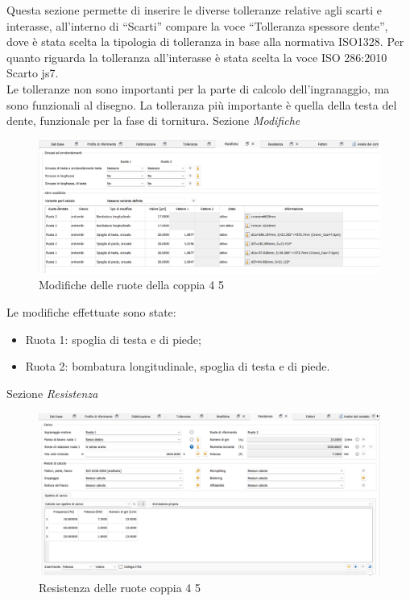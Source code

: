 Questa sezione permette di inserire le diverse tolleranze relative agli scarti e interasse, all’interno di “Scarti” compare la voce “Tolleranza spessore dente”, dove è stata scelta la tipologia di tolleranza in base alla normativa ISO1328. Per quanto riguarda la tolleranza all’interasse è stata scelta la voce ISO 286:2010 Scarto js7.\\
Le tolleranze non sono importanti per la parte di calcolo dell’ingranaggio, ma sono funzionali al disegno. La tolleranza più importante è quella della testa del dente, funzionale per la fase di tornitura. 
\newpage
Sezione \emph{Modifiche}
\begin{figure}[h]
    \centering
    \includegraphics[scale=0.4]{Immagini/ModificheCoppia45.png}
    \caption{Modifiche delle ruote della coppia 4 5}
    \label{fig:ModificheCoppia45}
\end{figure}

Le modifiche effettuate sono state:
\begin{itemize}
    \item Ruota 1: spoglia di testa e di piede;
    \item Ruota 2: bombatura longitudinale, spoglia di testa e di piede.
\end{itemize}

Sezione \emph{Resistenza}
\begin{figure}[h]
    \centering
    \includegraphics[scale=0.39]{Immagini/ResistenzaCoppia45.png}
    \caption{Resistenza delle ruote coppia 4 5}
    \label{fig:ResistenzaCoppia45}
\end{figure}

